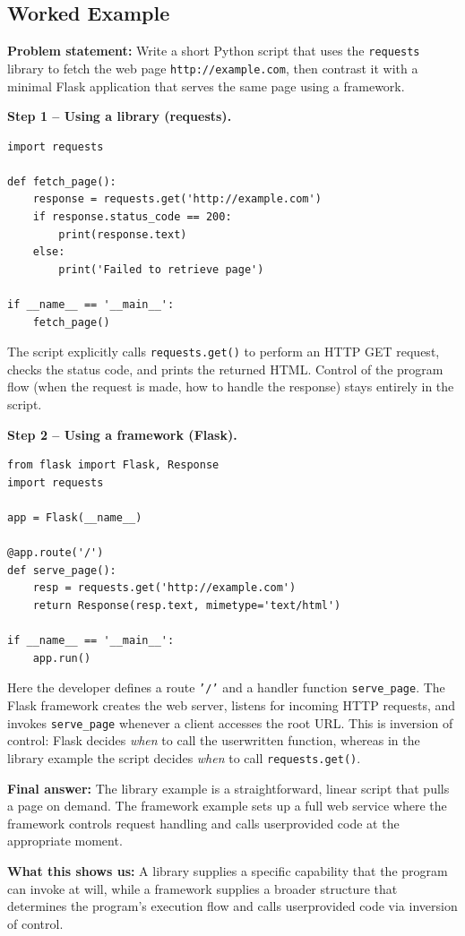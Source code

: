 \documentclass[12pt, a4paper]{article}
\begin{document}
\subsection{Worked Example}
\textbf{Problem statement:} Write a short Python script that uses the \texttt{requests} library to fetch the web page \texttt{http://example.com}, then contrast it with a minimal Flask application that serves the same page using a framework.

\medskip
\textbf{Step 1 -- Using a library (requests).}
\begin{verbatim}
import requests

def fetch_page():
    response = requests.get('http://example.com')
    if response.status_code == 200:
        print(response.text)
    else:
        print('Failed to retrieve page')

if __name__ == '__main__':
    fetch_page()
\end{verbatim}
The script explicitly calls \texttt{requests.get()} to perform an HTTP GET request, checks the status code, and prints the returned HTML.  Control of the program flow (when the request is made, how to handle the response) stays entirely in the script.

\medskip
\textbf{Step 2 -- Using a framework (Flask).}
\begin{verbatim}
from flask import Flask, Response
import requests

app = Flask(__name__)

@app.route('/')
def serve_page():
    resp = requests.get('http://example.com')
    return Response(resp.text, mimetype='text/html')

if __name__ == '__main__':
    app.run()
\end{verbatim}
Here the developer defines a route \texttt{'/'} and a handler function \texttt{serve\_page}.  The Flask framework creates the web server, listens for incoming HTTP requests, and invokes \texttt{serve\_page} whenever a client accesses the root URL.  This is inversion of control: Flask decides \textit{when} to call the userwritten function, whereas in the library example the script decides \textit{when} to call \texttt{requests.get()}.

\textbf{Final answer:} The library example is a straightforward, linear script that pulls a page on demand.  The framework example sets up a full web service where the framework controls request handling and calls userprovided code at the appropriate moment.

\textbf{What this shows us:} A library supplies a specific capability that the program can invoke at will, while a framework supplies a broader structure that determines the program's execution flow and calls userprovided code via inversion of control.  
\end{document}
